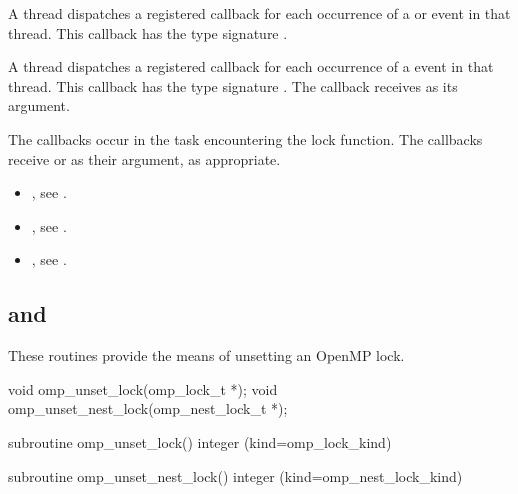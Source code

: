 A thread dispatches a registered 
callback for each occurrence of a  or  event 
in that thread.  This callback has the type signature .

A thread dispatches a registered 
callback for each occurrence of a  event 
in that thread. This callback has the type signature .
The callback receives  as its  argument.

The callbacks occur in the task encountering
the lock function.  The callbacks receive  or 
  as their  argument, as appropriate.


\crossreferences
\begin{itemize}
\item {}, see 
.
\item {}, see 
.
\item {}, see
.
\end{itemize}




\subsection{ and }
\label{subsec:omp_unset_lock and omp_unset_nest_lock}
\summary
These routines provide the means of unsetting an OpenMP lock.

\format
\ccppspecificstart
\begin{boxedcode}
void omp\_unset\_lock(omp\_lock\_t *);
void omp\_unset\_nest\_lock(omp\_nest\_lock\_t *);
\end{boxedcode}
\ccppspecificend

\fortranspecificstart
\begin{boxedcode}
subroutine omp\_unset\_lock()
integer (kind=omp\_lock\_kind) 

subroutine omp\_unset\_nest\_lock()
integer (kind=omp\_nest\_lock\_kind) 
\end{boxedcode}
\fortranspecificend

